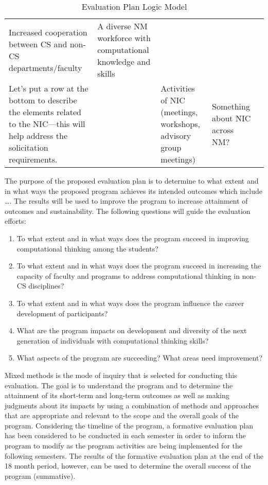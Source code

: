 \begin{table}[hp!]
\begin{tabular}{|p{1in}|p{1in}|p{1in}|p{1in}|p{1in}|}
    \vspace{0.25in}
    Increased cooperation between CS and non-CS departments/faculty

    & 
    A diverse NM workforce with computational knowledge and skills \\
    
    Let’s put a row at the bottom to describe the elements related to the NIC—this will help address the solicitation requirements.
    &
    &
    Activities of NIC (meetings, workshops, advisory group meetings)
    &
    Something about NIC across NM?
    &
    \\
\hline
\end{tabular}
\caption{Evaluation Plan Logic Model}
\label{tab:logic-model}
\end{table}

The purpose of the proposed evaluation plan is to determine to what extent and in what ways the proposed program achieves its intended outcomes which include …. The results will be used to improve the program to increase attainment of outcomes and sustainability. The following questions will guide the evaluation efforts: 
\begin{enumerate}
\item To what extent and in what ways does the program succeed in improving computational thinking among the students? 
\item To what extent and in what ways does the program succeed in increasing the capacity of faculty and programs to address computational thinking in non-CS disciplines? 
\item To what extent and in what ways does the program influence the career development of participants?
\item What are the program impacts on development and diversity of the next generation of individuals with computational thinking skills?
\item What aspects of the program are succeeding? What areas need improvement? 
\end{enumerate}

Mixed methods is the mode of inquiry that is selected for conducting this evaluation. The goal is to understand the program and to determine the attainment of its short-term and long-term outcomes as well as making judgments about its impacts by using a combination of methods and approaches that are appropriate and relevant to the scope and the overall goals of the program.    
Considering the timeline of the program, a formative evaluation plan has been considered to be conducted in each semester in order to inform the program to modify as the program activities are being implemented for the following semesters. The results of the formative evaluation plan at the end of the 18 month period, however, can be used to determine the overall success of the program (summative). 

